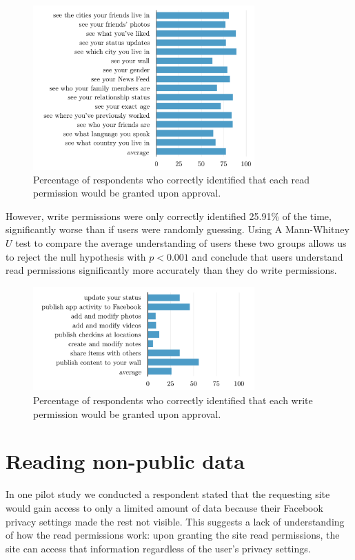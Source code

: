 \documentclass[twoside,letterpaper]{soups-poster}
\begin{document}
\begin{figure}[tbh]
  \centering
  \includegraphics[width=8.5cm]{read_percents_cosn}
  \caption{Percentage of respondents who correctly identified that each read permission would be granted upon approval.}
  \label{figure:readpercents}
\end{figure}

\clearpage

However, write permissions were only correctly identified 25.91\% of the time, significantly worse than if users were randomly guessing.
Using A Mann-Whitney $U$ test to compare the average understanding of users these two groups allows us to reject the null hypothesis with $p < 0.001$ and conclude that users understand read permissions significantly more accurately than they do write permissions.

\begin{figure}[t!]
  \centering
  \includegraphics[width=8.5cm]{write_percents_cosn}
  \caption{Percentage of respondents who correctly identified that each write permission would be granted upon approval.}
  \label{figure:writepercents}
\end{figure}

\section{Reading non-public data}

In one pilot study we conducted a respondent stated that the requesting site would gain access to only a limited amount of data because their Facebook privacy settings made the rest not visible.
This suggests a lack of understanding of how the read permissions work: upon granting the site read permissions, the site can access that information regardless of the user's privacy settings.
\end{document}
